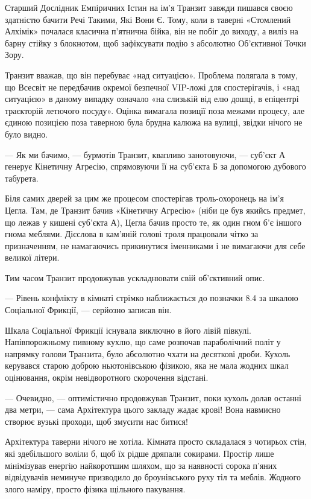 \documentclass[12pt, a4paper, openany]{book}
\begin{document}
\begin{terrybox}
Старший Дослідник Емпіричних Істин на ім'я Транзит завжди пишався своєю здатністю бачити Речі Такими, Які Вони Є. Тому, коли в таверні «Стомлений Алхімік» почалася класична п'ятнична бійка, він не побіг до виходу, а виліз на барну стійку з блокнотом, щоб зафіксувати подію з абсолютно Об'єктивної Точки Зору.

Транзит вважав, що він перебуває «над ситуацією». Проблема полягала в тому, що Всесвіт не передбачив окремої безпечної VIP-ложі для спостерігачів, і «над ситуацією» в даному випадку означало «на слизькій від елю дошці, в епіцентрі траєкторій летючого посуду». Оцінка вимагала позиції поза межами процесу, але єдиною позицією поза таверною була брудна калюжа на вулиці, звідки нічого не було видно.

\medskip
--- Як ми бачимо, --- бурмотів Транзит, квапливо занотовуючи, --- суб'єкт А генерує Кінетичну Агресію, спрямовуючи її на суб'єкта Б за допомогою дубового табурета.

\medskip
Біля самих дверей за цим же процесом спостерігав троль-охоронець на ім'я Цегла. Там, де Транзит бачив «Кінетичну Агресію» (ніби це був якийсь предмет, що лежав у кишені суб'єкта А), Цегла бачив просто те, як один гном б'є іншого гнома меблями. Дієслова в кам'яній голові троля працювали чітко за призначенням, не намагаючись прикинутися іменниками і не вимагаючи для себе великої літери.

Тим часом Транзит продовжував ускладнювати свій об'єктивний опис.

\medskip
--- Рівень конфлікту в кімнаті стрімко наближається до позначки 8.4 за шкалою Соціальної Фрикції, --- серйозно записав він.

\medskip
Шкала Соціальної Фрикції існувала виключно в його лівій півкулі. Напівпорожньому пивному кухлю, що саме розпочав параболічний політ у напрямку голови Транзита, було абсолютно чхати на десяткові дроби. Кухоль керувався старою доброю ньютонівською фізикою, яка не мала жодних шкал оцінювання, окрім невідворотного скорочення відстані.

\medskip
--- Очевидно, --- оптимістично продовжував Транзит, поки кухоль долав останні два метри, --- сама Архітектура цього закладу жадає крові! Вона навмисно створює вузькі проходи, щоб змусити нас битися!

\medskip
Архітектура таверни нічого не хотіла. Кімната просто складалася з чотирьох стін, які здебільшого воліли б, щоб їх рідше дряпали сокирами. Простір лише мінімізував енергію найкоротшим шляхом, що за наявності сорока п'яних відвідувачів неминуче призводило до броунівського руху тіл та меблів. Жодного злого наміру, просто фізика щільного пакування.


\end{terrybox}
\end{document}
